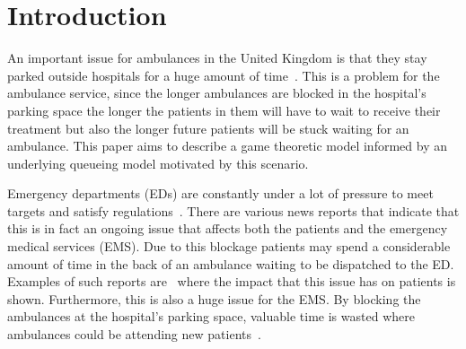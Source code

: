 \section{Introduction}


An important issue for ambulances in the United Kingdom is that they stay 
parked outside hospitals for a huge amount of time~\cite{clarey2014ambulance}. 
This is a problem for the ambulance service, since the longer ambulances are
blocked in the hospital's parking space the longer the patients in them will
have to wait to receive their treatment but also the longer future patients 
will be stuck waiting for an ambulance.
This paper aims to describe a game theoretic model informed by an underlying 
queueing model motivated by this scenario.

Emergency departments (EDs) are constantly under a lot of pressure to meet 
targets and satisfy regulations~\cite{EmergencyDepartmentWinterPressures}.
There are various news reports that indicate that this is in fact an ongoing 
issue that affects both the patients and the emergency medical services (EMS).
Due to this blockage patients may spend a considerable amount of time in the 
back of an ambulance waiting to be dispatched to the ED.
Examples of such reports are~\cite{mirror, thenews, bmj} where
the impact that this issue has on patients is shown. 
Furthermore, this is also a huge issue for the EMS.
By blocking the ambulances at the hospital's parking space, valuable time is 
wasted where ambulances could be attending new patients~\cite{eastanglia}.

